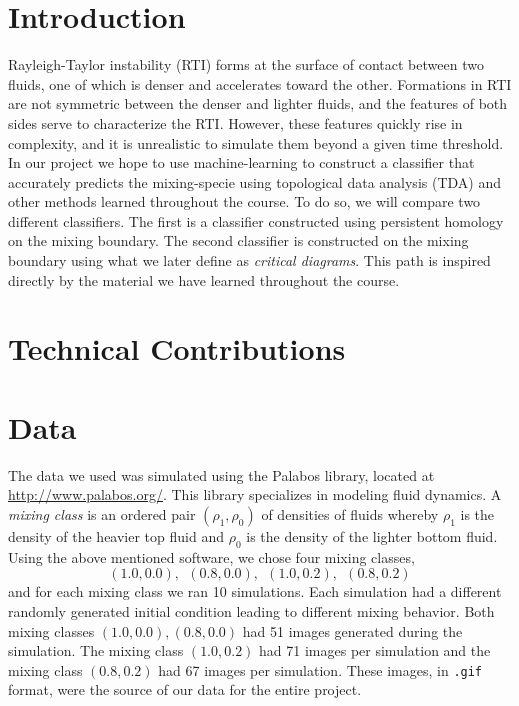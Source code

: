 \documentclass[12pt, fullpage,letterpaper]{article}
\begin{document}
	\section*{\normalfont Introduction}
	Rayleigh-Taylor instability (RTI) forms at the surface of contact between two fluids, one of which is denser and accelerates toward the other. Formations in RTI are not symmetric between the denser and lighter fluids, and the features of both sides serve to characterize the RTI. However, these features quickly rise in complexity, and it is unrealistic to simulate them beyond a given time threshold. In our project we hope to use machine-learning to construct a classifier that accurately predicts the mixing-specie using topological data analysis (TDA) and other methods learned throughout the course. To do so, we will compare two different classifiers. The first is a classifier constructed using persistent homology on the mixing boundary. The second classifier is constructed on the mixing boundary using what we later define as \emph{critical diagrams}. This path is inspired directly by the material we have learned throughout the course.
	
	\section*{\normalfont Technical Contributions} 
	\section*{\normalfont Data}
	The data we used was simulated using the Palabos library, located at \url{http://www.palabos.org/}. This library specializes in modeling fluid dynamics. A \emph{mixing class} is an ordered pair $(\rho_1, \rho_0)$ of densities of fluids whereby $\rho_1$ is the density of the heavier top fluid and $\rho_0$ is the density of the lighter bottom fluid. Using the above mentioned software, we chose four mixing classes, 
	$$
		(1.0, 0.0), \ \ (0.8, 0.0), \ \ (1.0, 0.2), \ \ (0.8, 0.2)
	$$
	and for each mixing class we ran 10 simulations. Each simulation had a different randomly generated initial condition leading to different mixing behavior. Both mixing classes $(1.0, 0.0), (0.8, 0.0)$ had 51 images generated during the simulation. The mixing class $(1.0, 0.2)$ had 71 images per simulation and the mixing class $(0.8, 0.2)$ had 67 images per simulation. These images, in \texttt{.gif} format, were the source of our data for the entire project. 
	
\end{document}
